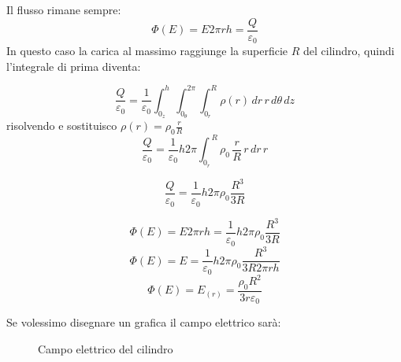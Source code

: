 Il flusso rimane sempre:
\begin{equation*}
    \Phi(E) = E2\pi rh = \frac{Q}{\varepsilon_0}
\end{equation*}
In questo caso la carica al massimo raggiunge la superficie $R$ del cilindro, quindi l'integrale di prima diventa:


\begin{equation*}
    \frac{Q}{\varepsilon_0} = \frac{1}{\varepsilon_0} \int_{0_z}^h \int_{0_\theta} ^{2\pi} \int_{0_r}^{R} {\rho(r)\,dr\,r\,d\theta\,dz}
\end{equation*}
risolvendo e sostituisco $ \rho(r) = \rho_0\frac{r}{R}$ 
\begin{equation*}
    \frac{Q}{\varepsilon_0} = \frac{1}{\varepsilon_0} h 2\pi \int_{0_r}^{\ R} \rho_0\,\frac{r}{R}\,r\,dr\,r
\end{equation*}

\begin{equation*}
    \frac{Q}{\varepsilon_0} = \frac{1}{\varepsilon_0} h 2\pi \rho_0\frac{ R^3}{3R}
\end{equation*}

\begin{equation*}
    \Phi(E) = E2\pi rh = \frac{1}{\varepsilon_0} h 2\pi \rho_0\frac{ R^3}{3R}
\end{equation*}
\begin{equation*}
    \Phi(E) = E = \frac{1}{\varepsilon_0} h 2\pi \rho_0\frac{ R^3}{3R 2\pi rh}
\end{equation*}
\begin{equation}
    \Phi(E) = E_{(r)} = \frac{\rho_0 R^2}{3r\varepsilon_0}
\end{equation}

Se volessimo disegnare un grafica il campo elettrico sarà:

\begin{figure}[H]
\def\xmax{5.0}
\def\ymax{3.3}
\def\tick#1#2{\draw[thick] (#1) ++ (#2:0.03*\ymax) --++ (#2-180:0.06*\ymax)}
    \centering
    \caption{Campo elettrico del cilindro}
    \label{fig:plotCilindro}
\end{figure}

